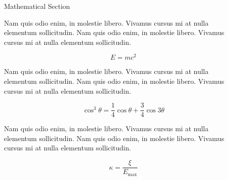 \documentclass[final]{beamer}
\newlength{\onecolwid}
\newlength{\twocolwid}
\begin{document}
\begin{frame}[t]
\begin{columns}[t]
\begin{column}{\twocolwid}

\begin{columns}[t,totalwidth=\twocolwid] %

\begin{column}{\onecolwid} %


\begin{block}{Mathematical Section}

Nam quis odio enim, in molestie libero. Vivamus cursus mi at nulla elementum sollicitudin. Nam quis odio enim, in molestie libero. Vivamus cursus mi at nulla elementum sollicitudin.

\begin{equation}
E = mc^{2}
\label{eqn:Einstein}
\end{equation}

Nam quis odio enim, in molestie libero. Vivamus cursus mi at nulla elementum sollicitudin. Nam quis odio enim, in molestie libero. Vivamus cursus mi at nulla elementum sollicitudin.

\begin{equation}
\cos^3 \theta =\frac{1}{4}\cos\theta+\frac{3}{4}\cos 3\theta
\label{eq:refname}
\end{equation}

Nam quis odio enim, in molestie libero. Vivamus cursus mi at nulla elementum sollicitudin. Nam quis odio enim, in molestie libero. Vivamus cursus mi at nulla elementum sollicitudin.

\begin{equation}
\kappa =\frac{\xi}{E_{\mathrm{max}}} %
\end{equation}

\end{block}


\end{column} %

\begin{column}{\onecolwid} %


\end{column}
\end{columns}
\end{column}
\end{columns}
\end{frame}
\end{document}
